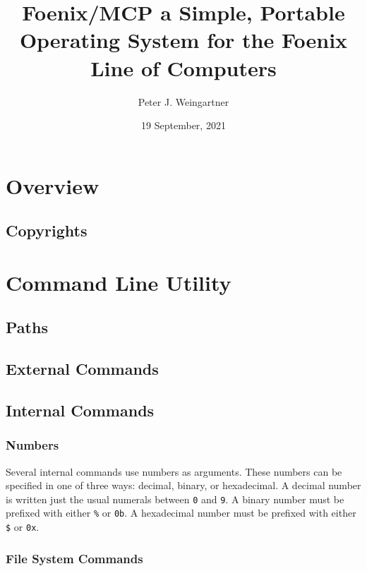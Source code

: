 \documentclass{report}
\begin{document}
\newcommand{\MCP}{{\sc Foenix/MCP}}
\newcommand{\param}[1]{{\tt #1}}
\newcommand{\name}[1]{{\tt #1}}

\title{{\MCP} a Simple, Portable Operating System for the Foenix Line of Computers}
\author{Peter J. Weingartner}
\date{19 September, 2021}
\maketitle

\chapter{Overview}

\section{Copyrights}

\chapter{Command Line Utility}

\section{Paths}

\section{External Commands}

\section{Internal Commands}

\subsection{Numbers}

Several internal commands use numbers as arguments.
These numbers can be specified in one of three ways: decimal, binary, or hexadecimal.
A decimal number is written just the usual numerals between \param{0} and \param{9}.
A binary number must be prefixed with either \param{\%} or \param{0b}.
A hexadecimal number must be prefixed with either \param{\$} or \param{0x}.

\subsection{File System Commands}
\end{document}
